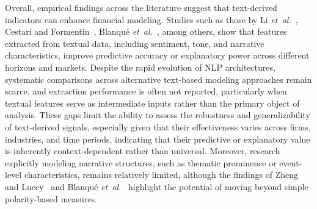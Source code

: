 
Overall, empirical findings across the literature suggest that text-derived indicators can enhance financial modeling. Studies such as those by Li \emph{et~al.}~\cite{de270}, Cestari and Formentin~\cite{d892a}, Blanqué \emph{et~al.}~\cite{0f204}, among others, show that features extracted from textual data, including sentiment, tone, and narrative characteristics, improve predictive accuracy or explanatory power across different horizons and markets. Despite the rapid evolution of NLP architectures, systematic comparisons across alternative text-based modeling approaches remain scarce, and extraction performance is often not reported, particularly when textual features serve as intermediate inputs rather than the primary object of analysis. These gaps limit the ability to assess the robustness and generalizability of text-derived signals, especially given that their effectiveness varies across firms, industries, and time periods, indicating that their predictive or explanatory value is inherently context-dependent rather than universal. Moreover, research explicitly modeling narrative structures, such as thematic prominence or event-level characteristics, remains relatively limited, although the findings of Zheng and Lucey~\cite{4e6ff} and Blanqué \emph{et~al.}~\cite{0f204} highlight the potential of moving beyond simple polarity-based measures.

